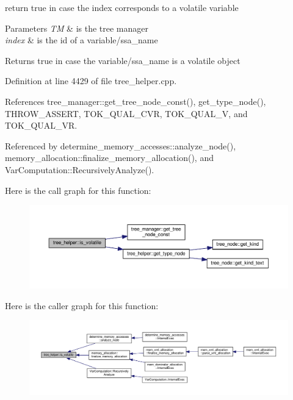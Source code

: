 return true in case the index corresponds to a volatile variable 


\begin{DoxyParams}{Parameters}
{\em TM} & is the tree manager \\
\hline
{\em index} & is the id of a variable/ssa\+\_\+name \\
\hline
\end{DoxyParams}
\begin{DoxyReturn}{Returns}
true in case the variable/ssa\+\_\+name is a volatile object 
\end{DoxyReturn}


Definition at line 4429 of file tree\+\_\+helper.\+cpp.



References tree\+\_\+manager\+::get\+\_\+tree\+\_\+node\+\_\+const(), get\+\_\+type\+\_\+node(), T\+H\+R\+O\+W\+\_\+\+A\+S\+S\+E\+RT, T\+O\+K\+\_\+\+Q\+U\+A\+L\+\_\+\+C\+VR, T\+O\+K\+\_\+\+Q\+U\+A\+L\+\_\+V, and T\+O\+K\+\_\+\+Q\+U\+A\+L\+\_\+\+VR.



Referenced by determine\+\_\+memory\+\_\+accesses\+::analyze\+\_\+node(), memory\+\_\+allocation\+::finalize\+\_\+memory\+\_\+allocation(), and Var\+Computation\+::\+Recursively\+Analyze().

Here is the call graph for this function\+:
\nopagebreak
\begin{figure}[H]
\begin{center}
\leavevmode
\includegraphics[width=350pt]{d7/d99/classtree__helper_ae79793b8505fcb90640915552fa680bc_cgraph}
\end{center}
\end{figure}
Here is the caller graph for this function\+:
\nopagebreak
\begin{figure}[H]
\begin{center}
\leavevmode
\includegraphics[width=350pt]{d7/d99/classtree__helper_ae79793b8505fcb90640915552fa680bc_icgraph}
\end{center}
\end{figure}
\mbox{\label{classtree__helper_a4d36920cdb412e76abae84bf9700629f}} 
